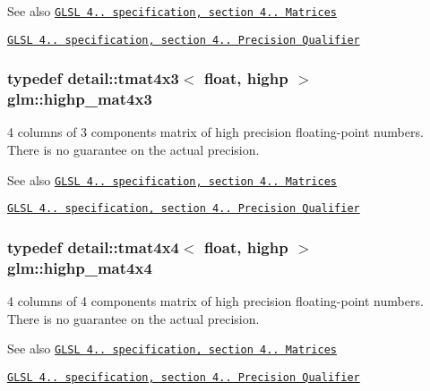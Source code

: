 \begin{DoxySeeAlso}{See also}
\href{http://www.opengl.org/registry/doc/GLSLangSpec.4.20.8.pdf}{\tt G\+L\+SL 4.. specification, section 4.. Matrices} 

\href{http://www.opengl.org/registry/doc/GLSLangSpec.4.20.8.pdf}{\tt G\+L\+SL 4.. specification, section 4.. Precision Qualifier} 
\end{DoxySeeAlso}
\subsubsection[{\texorpdfstring{highp\+\_\+mat4x3}{highp_mat4x3}}]{\setlength{\rightskip}{0pt plus 5cm}typedef detail\+::tmat4x3$<$ float, highp $>$ {\bf glm\+::highp\+\_\+mat4x3}}\hypertarget{group__core__precision_gab8dfe989c5100c35ab5dec0e94f59d2a}{}\label{group__core__precision_gab8dfe989c5100c35ab5dec0e94f59d2a}
4 columns of 3 components matrix of high precision floating-\/point numbers. There is no guarantee on the actual precision.

\begin{DoxySeeAlso}{See also}
\href{http://www.opengl.org/registry/doc/GLSLangSpec.4.20.8.pdf}{\tt G\+L\+SL 4.. specification, section 4.. Matrices} 

\href{http://www.opengl.org/registry/doc/GLSLangSpec.4.20.8.pdf}{\tt G\+L\+SL 4.. specification, section 4.. Precision Qualifier} 
\end{DoxySeeAlso}
\subsubsection[{\texorpdfstring{highp\+\_\+mat4x4}{highp_mat4x4}}]{\setlength{\rightskip}{0pt plus 5cm}typedef detail\+::tmat4x4$<$ float, highp $>$ {\bf glm\+::highp\+\_\+mat4x4}}\hypertarget{group__core__precision_ga231950d260be295a25d7340e2020f55c}{}\label{group__core__precision_ga231950d260be295a25d7340e2020f55c}
4 columns of 4 components matrix of high precision floating-\/point numbers. There is no guarantee on the actual precision.

\begin{DoxySeeAlso}{See also}
\href{http://www.opengl.org/registry/doc/GLSLangSpec.4.20.8.pdf}{\tt G\+L\+SL 4.. specification, section 4.. Matrices} 

\href{http://www.opengl.org/registry/doc/GLSLangSpec.4.20.8.pdf}{\tt G\+L\+SL 4.. specification, section 4.. Precision Qualifier} 
\end{DoxySeeAlso}
